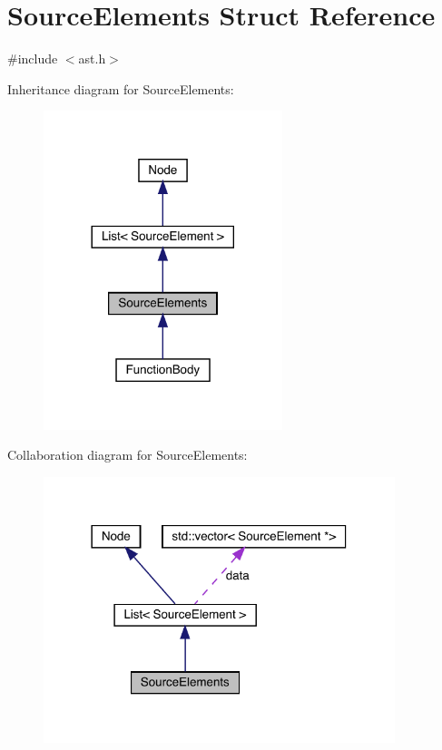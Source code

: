 \hypertarget{struct_source_elements}{}\section{Source\+Elements Struct Reference}
\label{struct_source_elements}


{\ttfamily \#include $<$ast.\+h$>$}



Inheritance diagram for Source\+Elements\+:\nopagebreak
\begin{figure}[H]
\begin{center}
\leavevmode
\includegraphics[width=197pt]{struct_source_elements__inherit__graph}
\end{center}
\end{figure}


Collaboration diagram for Source\+Elements\+:\nopagebreak
\begin{figure}[H]
\begin{center}
\leavevmode
\includegraphics[width=290pt]{struct_source_elements__coll__graph}
\end{center}
\end{figure}
